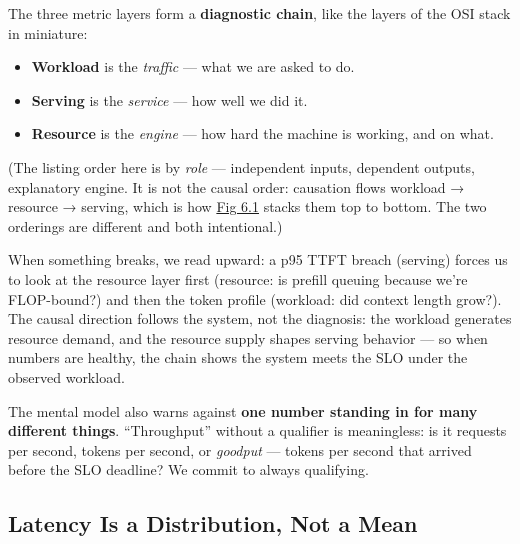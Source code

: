 \label{mental-model}


The three metric layers form a \textbf{diagnostic chain}, like the
layers of the OSI stack in miniature:

\begin{itemize}
\tightlist
\item
  \textbf{Workload} is the \emph{traffic} --- what we are asked to do.
\item
  \textbf{Serving} is the \emph{service} --- how well we did it.
\item
  \textbf{Resource} is the \emph{engine} --- how hard the machine is
  working, and on what.
\end{itemize}

(The listing order here is by \emph{role} --- independent inputs,
dependent outputs, explanatory engine. It is not the causal order:
causation flows workload → resource → serving, which is how \hyperref[fig:6.1]{Fig 6.1}
stacks them top to bottom. The two orderings are different and both
intentional.)

When something breaks, we read upward: a p95 TTFT breach (serving)
forces us to look at the resource layer first (resource: is prefill
queuing because we're FLOP-bound?) and then the token profile (workload:
did context length grow?). The causal direction follows the system, not
the diagnosis: the workload generates resource demand, and the resource
supply shapes serving behavior --- so when numbers are healthy, the
chain shows the system meets the SLO under the observed workload.

The mental model also warns against \textbf{one number standing in for
many different things}. ``Throughput'' without a qualifier is
meaningless: is it requests per second, tokens per second, or
\emph{goodput} --- tokens per second that arrived before the SLO
deadline? We commit to always qualifying.

\label{worked-example}


\subsection{Latency Is a Distribution, Not a
Mean}\label{latency-is-a-distribution-not-a-mean}

